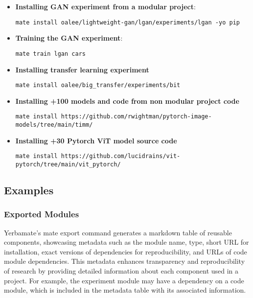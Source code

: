 \begin{itemize}
    \item \textbf{Installing GAN experiment from a modular project}: 
    
    \texttt{mate install oalee/lightweight-gan/lgan/experiments/lgan -yo pip}
    \item \textbf{Training the GAN experiment}: 
    
    \texttt{mate train lgan cars}
    
    \item \textbf{Installing transfer learning experiment}

    \texttt{mate install oalee/big\_transfer/experiments/bit}
    
    \item \textbf{Installing +100 models and code from non modular project code}

    \texttt{mate install https://github.com/rwightman/pytorch-image-models/tree/main/timm/}

    \item \textbf{Installing +30 Pytorch ViT model source code}
    
    \texttt{mate install https://github.com/lucidrains/vit-pytorch/tree/main/vit\_pytorch/}

\end{itemize}


\subsection{Examples}


\subsubsection{Exported Modules}

Yerbamate's mate export command generates a markdown table of reusable components, showcasing metadata such as the module name, type, short URL for installation, exact versions of dependencies for reproducibility, and URLs of code module dependencies. This metadata enhances transparency and reproducibility of research by providing detailed information about each component used in a project. For example, the experiment module may have a dependency on a code module, which is included in the metadata table with its associated information.


